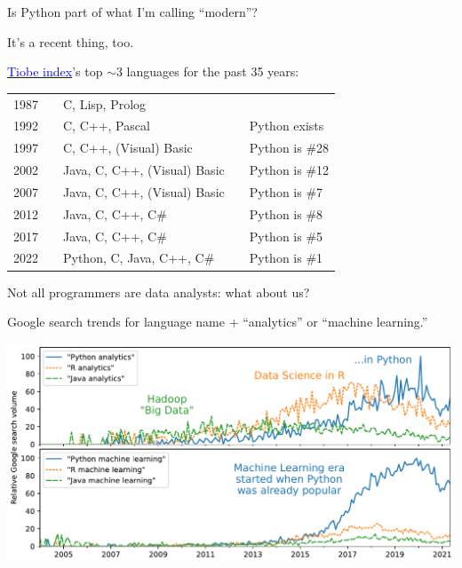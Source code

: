 \documentclass[aspectratio=169]{beamer}
\begin{document}
\begin{frame}{Is Python part of what I'm calling ``modern''?}
\large
\vspace{0.25 cm}

It's a recent thing, too.

\vspace{0.25 cm}
\href{https://www.tiobe.com/tiobe-index/}{\textcolor{blue}{Tiobe index}}'s top $\sim$3 languages for the past 35 years:

\renewcommand{\arraystretch}{1.25}
\begin{center}
\begin{tabular}{c c l c l}
1987 & & C, Lisp, Prolog                 & & \\
1992 & & C, C++, Pascal                  & & Python exists \\
1997 & & C, C++, (Visual) Basic          & & Python is \#28 \\
2002 & & Java, C, C++, (Visual) Basic    & & Python is \#12 \\
2007 & & Java, C, C++, (Visual) Basic    & & Python is \#7 \\
2012 & & Java, C, C++, C\#               & & Python is \#8 \\
2017 & & Java, C, C++, C\#               & & Python is \#5 \\
2022 & & Python, C, Java, C++, C\#       & & Python is \#1 \\
\end{tabular}
\end{center}
\end{frame}

\begin{frame}{Not all programmers are data analysts: what about us?}
\vspace{0.25 cm}

Google search trends for language name + ``analytics'' or ``machine learning.''

\includegraphics[width=\linewidth]{PLOTS/analytics-by-language.pdf}
\end{frame}
\end{document}
